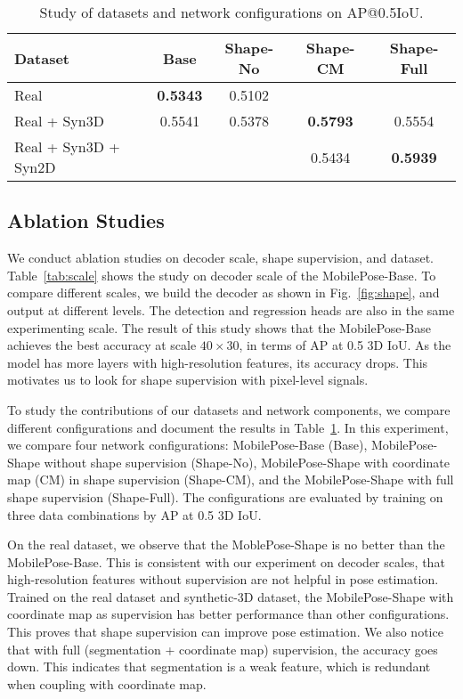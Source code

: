 \documentclass[runningheads]{llncs}
\begin{document}
\begin{table}[t]
\begin{center}
\begin{tabular}{l|@{\hskip 0.3cm}c@{\hskip 0.3cm}|c|c|c}
\hline
Dataset & Base & Shape-No & Shape-CM & Shape-Full\\
\hline
Real & \textbf{0.5343} & 0.5102 & & \\
\hline
Real + Syn3D & 0.5541 & 0.5378 & \textbf{0.5793} & 0.5554 \\
\hline
Real + Syn3D + Syn2D & & & 0.5434 & \textbf{0.5939} \\
\hline
\end{tabular}
\caption{Study of datasets and network configurations on AP@0.5IoU.}
\label{tab:config}
\end{center}
\end{table}

\subsection{Ablation Studies}
We conduct ablation studies on decoder scale, shape supervision, and dataset. Table~\ref{tab:scale} shows the study on decoder scale of the MobilePose-Base. To compare different scales, we build the decoder as shown in Fig.~\ref{fig:shape}, and output at different levels. The detection and regression heads are also in the same experimenting scale. The result of this study shows that the MobilePose-Base achieves the best accuracy at scale $40\times30$, in terms of AP at 0.5 3D IoU. As the model has more layers with high-resolution features, its accuracy drops. This motivates us to look for shape supervision with pixel-level signals.

To study the contributions of our datasets and network components, we compare different configurations and document the results in Table~\ref{tab:config}. In this experiment, we compare four network configurations: MobilePose-Base (Base), MobilePose-Shape without shape supervision (Shape-No), MobilePose-Shape with coordinate map (CM) in shape supervision (Shape-CM), and the MobilePose-Shape with full shape supervision (Shape-Full). The configurations are evaluated by training on three data combinations by AP at 0.5 3D IoU.

On the real dataset, we observe that the MoblePose-Shape is no better than the MobilePose-Base. This is consistent with our experiment on decoder scales, that high-resolution features without supervision are not helpful in pose estimation. Trained on the real dataset and synthetic-3D dataset, the MobilePose-Shape with coordinate map as supervision has better performance than other configurations. This proves that shape supervision can improve pose estimation. We also notice that with full (segmentation + coordinate map) supervision, the accuracy goes down. This indicates that segmentation is a weak feature, which is redundant when coupling with coordinate map.
\end{document}
